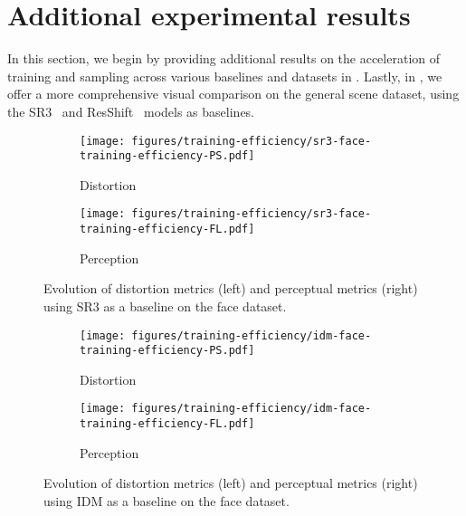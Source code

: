\section{Additional experimental results} 
In this section, we begin by providing additional results on the acceleration of training and sampling across various baselines and datasets in . Lastly, in , we offer a more comprehensive visual comparison on the general scene dataset, using the SR3~\cite{saharia2022image} and ResShift~\cite{yue2023resshift} models as baselines. 
\label{sec:app-exp}

\begin{figure}[t]
     \centering
     \begin{subfigure}[b]{0.23\textwidth}
         \centering
         \texttt{[image: figures/training-efficiency/sr3-face-training-efficiency-PS.pdf]}
         \caption{Distortion}
         \label{fig:sr3-face-training-ps}
     \end{subfigure}
     \begin{subfigure}[b]{0.242\textwidth}
         \centering
         \texttt{[image: figures/training-efficiency/sr3-face-training-efficiency-FL.pdf]}
         \caption{Perception}
         \label{fig:sr3-face-training-fl}
     \end{subfigure}
     \vspace{-.28in}
         \caption{Evolution of distortion metrics (left) and perceptual metrics (right) using SR3 as a baseline on the face dataset.}
        \label{fig:sr3-face-training}
        \vspace{-.1in}
\end{figure}

\begin{figure}[t]
     \centering
     \begin{subfigure}[b]{0.23\textwidth}
         \centering
         \texttt{[image: figures/training-efficiency/idm-face-training-efficiency-PS.pdf]}
         \caption{Distortion}
         \label{fig:idm-face-training-ps}
     \end{subfigure}
     \begin{subfigure}[b]{0.242\textwidth}
         \centering
         \texttt{[image: figures/training-efficiency/idm-face-training-efficiency-FL.pdf]}
         \caption{Perception}
         \label{fig:idm-face-training-fl}
     \end{subfigure}
     \vspace{-.28in}
         \caption{Evolution of distortion metrics (left) and perceptual metrics (right) using IDM as a baseline on the face dataset.}
        \label{fig:idm-face-training}
        \vspace{-.1in}
\end{figure}

